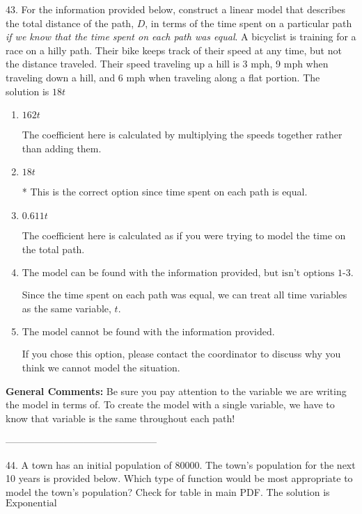 \documentclass{extbook}[14pt]
\begin{document}
43. For the information provided below, construct a linear model that describes the total distance of the path, $D$, in terms of the time spent on a particular path \textit{if we know that the time spent on each path was equal}.
A bicyclist is training for a race on a hilly path. Their bike keeps track of their speed at any time, but not the distance traveled. Their speed traveling up a hill is 3 mph, 9 mph when traveling down a hill, and 6 mph when traveling along a flat portion. 
The solution is $ 18 t $ 

\begin{enumerate}[label=\Alph*.] 
\item $ 162 t $ 

 The coefficient here is calculated by multiplying the speeds together rather than adding them. 
\item $ 18 t $ 

 * This is the correct option since time spent on each path is equal. 
\item $ 0.611 t $ 

 The coefficient here is calculated as if you were trying to model the time on the total path. 
\item $ \text{The model can be found with the information provided, but isn't options 1-3.} $ 

 Since the time spent on each path was equal, we can treat all time variables as the same variable, $t$. 
\item $ \text{The model cannot be found with the information provided.} $ 

 If you chose this option, please contact the coordinator to discuss why you think we cannot model the situation. 
\end{enumerate} 
 
\textbf{General Comments:} Be sure you pay attention to the variable we are writing the model in terms of. To create the model with a single variable, we have to know that variable is the same throughout each path!

-----------------------------------------------

44. A town has an initial population of 80000. The town's population for the next 10 years is provided below. Which type of function would be most appropriate to model the town's population?
Check for table in main PDF. 
The solution is $ \text{Exponential} $ 
\end{document}
